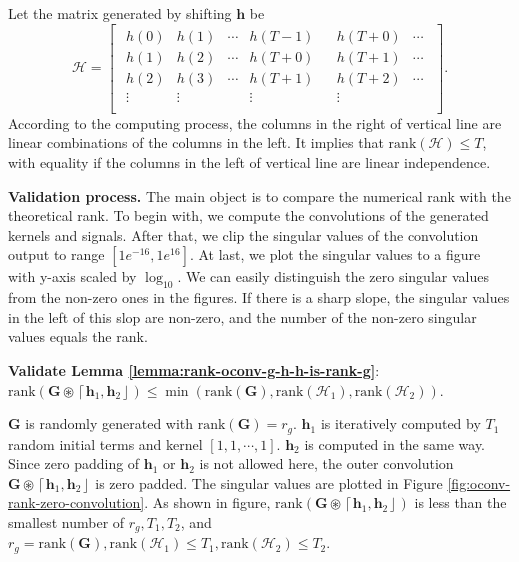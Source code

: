 \documentclass[twoside,11pt]{article}
\def\oconv{\circledast}
\def\rank{\text{rank}}
\def\tvar#1{\mathbf{#1}} %
\def\lcerfl#1{\left\lceil{#1}\right\rfloor}
\begin{document}
Let the matrix generated by shifting \(\tvar{h}\) be
  \begin{equation*}
    \mathcal{H}
    = \left[\begin{array}{c|c}
        \begin{matrix}
          h(0)   & h(1)   & \cdots & h(T-1) \\
          h(1)   & h(2)   & \cdots & h(T+0) \\
          h(2)   & h(3)   & \cdots & h(T+1) \\
          \vdots & \vdots &        & \vdots \\
        \end{matrix}
         &
        \begin{matrix}
          h(T+0) & \cdots \\
          h(T+1) & \cdots \\
          h(T+2) & \cdots \\
          \vdots &        \\
        \end{matrix}
      \end{array}\right].
  \end{equation*}
  According to the computing process, the columns in the right of vertical line are linear combinations of the columns in the left. It implies that \(\rank(\mathcal{H}) \le T\), with equality if the columns in the left of vertical line are linear independence.



  \textbf{Validation process.} The main object is to compare the numerical rank with the theoretical rank. To begin with, we compute the convolutions of the generated kernels and signals. After that, we clip the singular values of the convolution output to range  \([1e^{-16}, 1e^{16}]\). At last, we plot the singular values to a figure with y-axis scaled by \(\log_{10}\).
  We can easily distinguish the zero singular values from the non-zero ones in the figures. If there is a sharp slope, the singular values in the left of this slop are non-zero, and the number of the non-zero singular values equals the rank.


\textbf{Validate Lemma \ref{lemma:rank-oconv-g-h-h-is-rank-g}}: \(\rank(\tvar{G} \oconv \lcerfl{\tvar{h}_1, \tvar{h}_2}) \le \min\left(\rank(\tvar{G}), \rank(\mathcal{H}_1), \rank(\mathcal{H}_2)\right)\).

\(\tvar{G}\) is randomly generated with \(\rank(\tvar{G}) = r_g\). \(\tvar{h}_1\) is iteratively computed by \(T_1\) random initial terms and kernel \([1, 1, \cdots, 1]\). \(\tvar{h}_2\) is computed in the same way.
  Since zero padding of \(\tvar{h}_1\) or \(\tvar{h}_2\) is not allowed here, the outer convolution \(\tvar{G} \oconv \lcerfl{\tvar{h}_{1}, \tvar{h}_{2}}\) is zero padded.
  The singular values are plotted in Figure \ref{fig:oconv-rank-zero-convolution}.
  As shown in figure, \(\rank(\tvar{G} \oconv \lcerfl{\tvar{h}_{1}, \tvar{h}_{2}})\) is less than the smallest number of \(r_g, T_1, T_2\), and \(r_g = \rank(\tvar{G}), \rank(\mathcal{H}_1) \le T_1, \rank(\mathcal{H}_2) \le T_2\).
\end{document}
